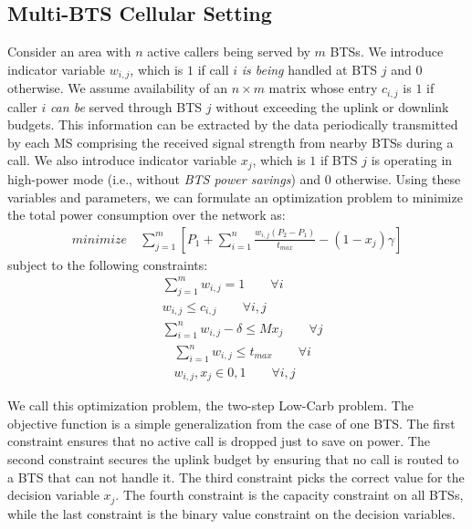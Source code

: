 \subsection{Multi-BTS Cellular Setting}
Consider an area with $n$ active callers being served by $m$ BTSs.
We introduce indicator variable $w_{i,j}$, which is $1$ if call
$i$ \textit{is being} handled at BTS $j$ and $0$ otherwise. We
assume availability of an $n\times m$ matrix whose entry
$c_{i,j}$ is $1$ if caller $i$ \textit{can be} served through
BTS $j$ without exceeding the uplink or downlink budgets.
This information can be extracted by the data periodically
transmitted by each MS comprising the received signal strength
from nearby BTSs during a call. We also introduce indicator
variable $x_j$, which is $1$ if BTS $j$ is operating in
high-power mode (i.e., without \textit{BTS power savings}) and
$0$ otherwise. Using these variables and parameters, we can
formulate an optimization problem to minimize the total power
consumption over the network as:
\begin{align}
\textit{minimize} \quad \sum_{j=1}^{m} \left[
P_1+\sum_{i=1}^{n}\frac{w_{i,j}(P_2-P_1)}{t_{max}}-(1-x_j)\gamma
\right]
\end{align}
subject to the following constraints:
\begin{align}
& \sum_{j=1}^m w_{i,j} = 1 \qquad \forall i \\
& w_{i,j} \leq c_{i,j} \qquad \forall i, j \\
& \sum_{i=1}^nw_{i,j}-\delta \leq Mx_j \qquad \forall j%
\end{align}
\begin{align}
& \sum_{i=1}^n w_{i,j} \le t_{max} \qquad \forall i \\
& w_{i,j}, x_j \in {0,1} \qquad \forall i, j%
\end{align}

We call this optimization problem, the two-step Low-Carb problem. The objective function is a simple generalization from the case
of one BTS. The first constraint ensures that no active call is
dropped just to save on power. The second constraint secures
the uplink budget by ensuring that no call is routed to a BTS
that can not handle it. The third constraint picks the correct
value for the decision variable $x_j$. The fourth constraint is the capacity constraint on all BTSs, while the last
constraint is the binary value constraint on the decision
variables.

